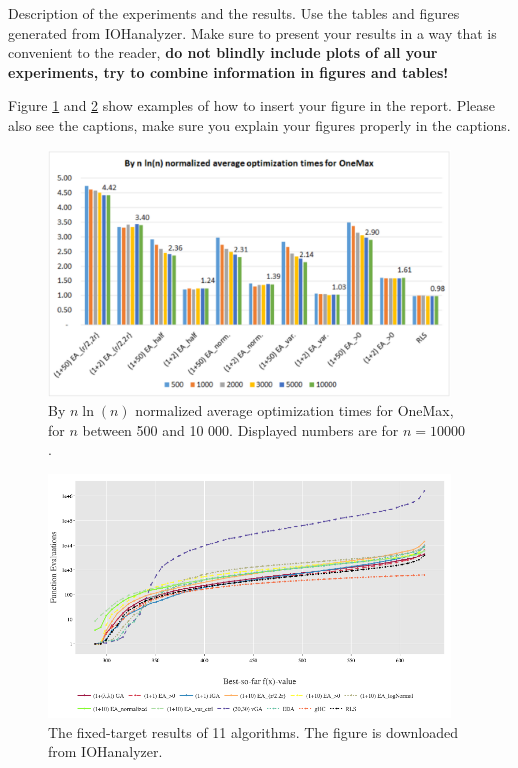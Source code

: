 \documentclass{article}
\begin{document}
Description of the experiments and the results. Use the tables and figures generated from IOHanalyzer. Make sure to present your results in a way that is convenient to the reader, \textbf{do not blindly include plots of all your experiments, try to combine information in figures and tables!} 

Figure \ref{fig:example} and \ref{fig:test} show examples of how to insert your figure in the report. Please also see the captions, make sure you explain your figures properly in the captions.

\begin{figure}[!ht]
 \begin{center}    \includegraphics[width=0.95\textwidth]{example.png}
 \end{center}
 \caption{By $n\ln(n)$ normalized average optimization times for OneMax, for $n$ between 500 and 10 000. Displayed numbers are for $n = 10 000$ \cite{ye2019interpolating}.}
 \label{fig:example}
\end{figure}


\begin{figure}[!ht]
 \begin{center}    \includegraphics[width=0.95\textwidth]{best-so-far.png}
 \end{center}
 \caption{The fixed-target results of 11 algorithms. The figure is downloaded from IOHanalyzer.}
 \label{fig:test}
\end{figure}
\end{document}
